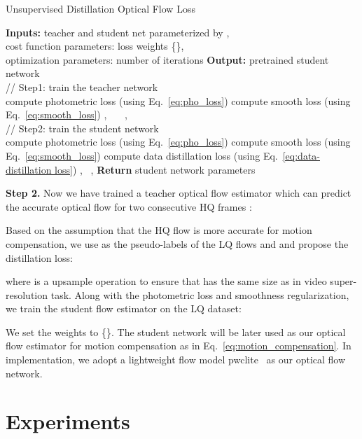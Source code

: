 \documentclass[nohyperref]{article}
\theoremstyle{plain}
\theoremstyle{definition}
\theoremstyle{remark}
\begin{document}
\begin{algorithm}[t]
\caption{Unsupervised Distillation Optical Flow Loss}
\label{alg:1}
\begin{algorithmic}
\STATE \textbf{Inputs:} teacher and student net parameterized by , \\
cost function parameters: loss weights \{\}, \\
optimization parameters: number of iterations 
\STATE \textbf{Output:} pretrained student network \\
// Step1: train the teacher network \\
\STATE compute photometric loss  (using Eq.~\eqref{eq:pho_loss})
\STATE compute smooth loss  (using Eq.~\eqref{eq:smooth_loss})
\STATE , ~~~,
\STATE 
\ENDFOR\\
// Step2: train the student network \\
\STATE compute photometric loss  (using Eq.~\eqref{eq:pho_loss})
\STATE compute smooth loss  (using Eq.~\eqref{eq:smooth_loss})
\STATE compute data distillation loss  (using Eq.~\eqref{eq:data-distillation loss})
\STATE , ~,
\STATE 
\ENDFOR
\STATE \textbf{Return} student network parameters~~
\end{algorithmic}
\end{algorithm}


%
 
\textbf{Step 2.} Now we have trained a teacher optical flow estimator  which can predict the accurate optical flow  for two consecutive HQ frames :

Based on the assumption that the HQ flow is more accurate for motion compensation, we use  as the pseudo-labels of the LQ flows  and and propose the distillation loss:


where  is a upsample operation to ensure that  has the same size as  in video super-resolution task.
Along with the photometric loss and smoothness regularization, we train the student flow estimator  on the LQ dataset:

We set the weights to \{\}.
The student network will be later used as our optical flow estimator for motion compensation as in Eq.~\eqref{eq:motion_compensation}. In implementation, we adopt a lightweight flow model pwclite~\cite{r55} as our optical flow network.

\vspace{-3mm}
\section{Experiments}
\vspace{-2mm}
\end{document}
